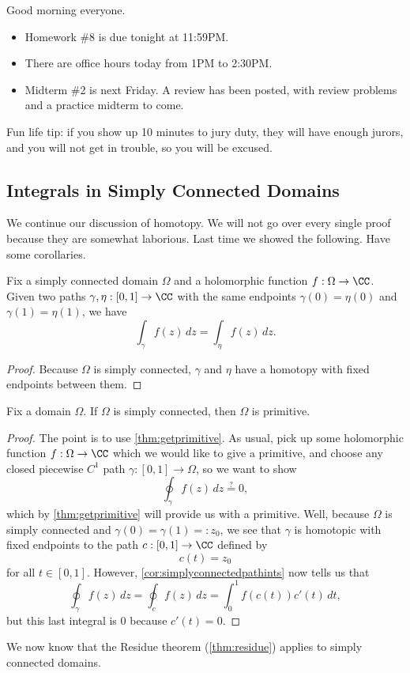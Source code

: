 
Good morning everyone.
\begin{itemize}
	\item Homework \#8 is due tonight at 11:59PM.
	\item There are office hours today from 1PM to 2:30PM.
	\item Midterm \#2 is next Friday. A review has been posted, with review problems and a practice midterm to come.
\end{itemize}
\begin{remark}[Morrow]
	Fun life tip: if you show up 10 minutes to jury duty, they will have enough jurors, and you will not get in trouble, so you will be excused.
\end{remark}

\subsection{Integrals in Simply Connected Domains}
We continue our discussion of homotopy. We will not go over every single proof because they are somewhat laborious. Last time we showed the following.
\homoind*
\noindent Have some corollaries.
\begin{corollary} \label{cor:simplyconnectedpathints}
	Fix a simply connected domain $\Omega$ and a holomorphic function $f:\Omega\to\CC$. Given two paths $\gamma,\eta:[0,1]\to\CC$ with the same endpoints $\gamma(0)=\eta(0)$ and $\gamma(1)=\eta(1)$, we have
	\[\int_\gamma f(z)\,dz=\int_\eta f(z)\,dz.\]
\end{corollary}
\begin{proof}
	Because $\Omega$ is simply connected, $\gamma$ and $\eta$ have a homotopy with fixed endpoints between them.
\end{proof}
\begin{corollary} \label{cor:simpconnisprimitive}
	Fix a domain $\Omega$. If $\Omega$ is simply connected, then $\Omega$ is primitive.
\end{corollary}
\begin{proof}
	The point is to use \autoref{thm:getprimitive}. As usual, pick up some holomorphic function $f:\Omega\to\CC$ which we would like to give a primitive, and choose any closed piecewise $C^1$ path $\gamma:[0,1]\to\Omega$, so we want to show
	\[\oint_\gamma f(z)\,dz\stackrel?=0,\]
	which by \autoref{thm:getprimitive} will provide us with a primitive. Well, because $\Omega$ is simply connected and $\gamma(0)=\gamma(1)=:z_0$, we see that $\gamma$ is homotopic with fixed endpoints to the path $c:[0,1]\to\CC$ defined by
	\[c(t)=z_0\]
	for all $t\in[0,1]$. However, \autoref{cor:simplyconnectedpathints} now tells us that
	\[\oint_\gamma f(z)\,dz=\oint_c f(z)\,dz=\int_0^1f(c(t))c'(t)\,dt,\]
	but this last integral is $0$ because $c'(t)=0$.
\end{proof}
\begin{example}
	We now know that the Residue theorem (\autoref{thm:residue}) applies to simply connected domains.
\end{example}

